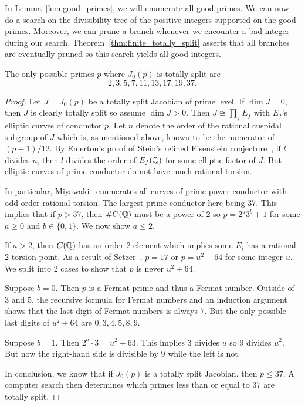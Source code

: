 In Lemma~\ref{lem:good_primes}, we will enumerate all good primes. We can now
do a search on the divisibility tree of the positive integers supported on the
good primes. Moreover, we can prune a branch whenever we encounter a bad
integer during our search. Theorem~\ref{thm:finite_totally_split} asserts that
all branches are eventually pruned so this search yields all good integers.

\begin{lemma}
    \label{lem:good_primes}
    The only possible primes $p$ where $J_0(p)$ is totally split are
    \[
        2, 3, 5, 7, 11, 13, 17, 19, 37.
    \]
\end{lemma}
\begin{proof}
    Let $J=J_0(p)$ be a totally split Jacobian of prime level. If $\dim J=0$,
    then $J$ is clearly totally split so assume $\dim J>0$. Then $J\cong
    \prod_f E_f$ with $E_f$'s elliptic curves of conductor $p$. Let $n$ denote
    the order of the rational cuspidal subgroup of $J$ which is, as mentioned
    above, known to be the numerator of $(p-1)/12$. By Emerton's proof of
    Stein's refined Eisenstein conjecture~\cite[Theorem B]{emerton:optimal}, if
    $l$ divides $n$, then $l$ divides the order of $E_f(\mathbb{Q})$ for some elliptic
    factor of $J$. But elliptic curves of prime conductor do not have much
    rational torsion.

    In particular, Miyawaki~\cite{miyawaki:ell_prime} enumerates all curves of prime
    power conductor with odd-order rational torsion. The largest prime
    conductor here being 37. This implies that if $p>37$, then $\#C(\mathbb{Q})$ must
    be a power of 2 so $p=2^a 3^b + 1$ for some $a\geq 0$ and $b\in \{0,1\}$.
    We now show $a\leq 2$.

    If $a>2$, then $C(\mathbb{Q})$ has an order 2 element which implies some $E_i$ has
    a rational 2-torsion point. As a result of Setzer~\cite[Theorem
    2]{setzer:ell_prime}, $p=17$ or $p=u^2+64$ for some integer $u$. We split into 2
    cases to show that $p$ is never $u^2+64$.

    Suppose $b=0$. Then $p$ is a Fermat prime and thus a Fermat number. Outside
    of $3$ and $5$, the recursive formula for Fermat numbers and an induction
    argument shows that the last digit of Fermat numbers is always $7$. But the
    only possible last digits of $u^2+64$ are $0, 3, 4, 5, 8, 9$.

    Suppose $b=1$. Then $2^a\cdot 3 = u^2+63$. This implies $3$ divides $u$ so
    $9$ divides $u^2$. But now the right-hand side is divisible by $9$ while the
    left is not.

    In conclusion, we know that if $J_0(p)$ is a totally split Jacobian, then $p\leq
    37$. A computer search then determines which primes less than or equal to
    $37$ are totally split.
\end{proof}


